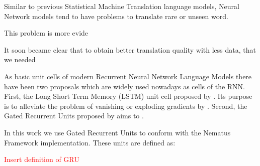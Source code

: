 Similar to previous Statistical Machine Translation language models, Neural Network models tend to have problems to translate rare or unseen word.

This problem is more evide

It soon became clear that to obtain better translation quality with less data, that we needed 

 

As basic unit cells of modern Recurrent Neural Network Language Models there have been two proposals which are widely used nowadays as cells of the RNN. First, the Long Short Term Memory (LSTM) unit cell proposed by \citet{hochreiter1997long}. Its purpose is to alleviate the problem of vanishing or exploding gradients by . Second, the Gated Recurrent Units proposed by \citet*{DBLP:journals/corr/ChoMGBSB14} aims to .

In this work we use Gated Recurrent Units to conform with the Nematus Framework implementation. These units are defined as:

\textcolor{red}{Insert definition of GRU}
\citep{DBLP:journals/corr/ChungGCB14}


